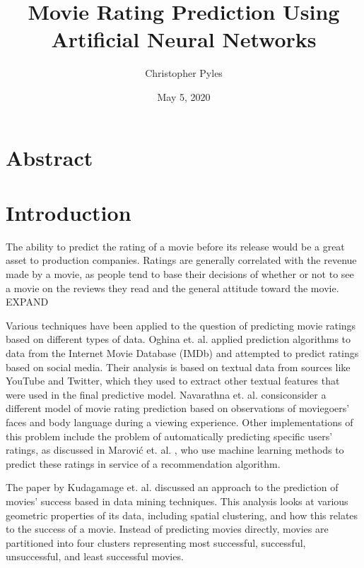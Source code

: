 \documentclass[12pt, oneside]{article}   	%
\title{%
	Movie Rating Prediction Using Artificial Neural Networks}
\author{Christopher Pyles}
\date{May 5, 2020}							%
\begin{document}
\maketitle

\newpage

\tableofcontents

\newpage

\section*{Abstract}

\newpage

\section{Introduction}

The ability to predict the rating of a movie before its release would be a great asset to production companies. Ratings are generally correlated with the revenue made by a movie, as people tend to base their decisions of whether or not to see a movie on the reviews they read and the general attitude toward the movie. EXPAND

Various techniques have been applied to the question of predicting movie ratings based on different types of data. Oghina et. al. \cite{oghina_predicting_2012} applied prediction algorithms to data from the Internet Movie Database (IMDb) and attempted to predict ratings based on social media. Their analysis is based on textual data from sources like YouTube and Twitter, which they used to extract other textual features that were used in the final predictive model. Navarathna et. al. \cite{navarathna_predicting_2014} consiconsider a different model of movie rating prediction based on observations of moviegoers' faces and body language during a viewing experience. Other implementations of this problem include the problem of automatically predicting specific users' ratings, as discussed in Marović et. al. \cite{marovic_automatic_2011}, who use machine learning methods to predict these ratings in service of a recommendation algorithm.

The paper by Kudagamage et. al. \cite{kudagamage_data_2018} discussed an approach to the prediction of movies' success based in data mining techniques. This analysis looks at various geometric properties of its data, including spatial clustering, and how this relates to the success of a movie. Instead of predicting movies directly, movies are partitioned into four clusters representing most successful, successful, unsuccessful, and least successful movies. 
\end{document}
